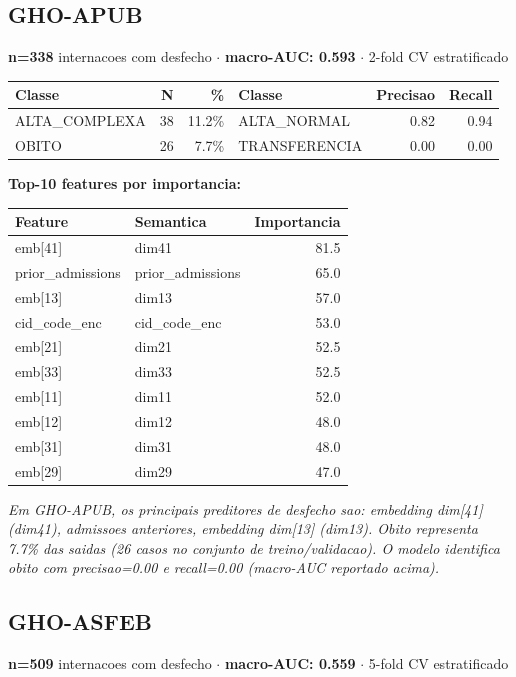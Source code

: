 \documentclass[11pt,a4paper]{article}
\begin{document}
\subsection{GHO-APUB}
\textbf{n=338} internacoes com desfecho $\cdot$ \textbf{macro-AUC: 0.593} $\cdot$ 2-fold CV estratificado

\begin{tabular}{lrr|lrr}
\toprule
Classe & N & \% & Classe & Precisao & Recall \\
\midrule
ALTA\_COMPLEXA & 38 & 11.2\% & ALTA\_NORMAL & 0.82 & 0.94 \\
OBITO & 26 & 7.7\% & TRANSFERENCIA & 0.00 & 0.00 \\
\bottomrule
\end{tabular}

\vspace{4pt}\noindent\textbf{Top-10 features por importancia:}

\begin{tabular}{llr}
\toprule
Feature & Semantica & Importancia \\
\midrule
emb[41] & dim41 & 81.5 \\
prior\_admissions & prior\_admissions & 65.0 \\
emb[13] & dim13 & 57.0 \\
cid\_code\_enc & cid\_code\_enc & 53.0 \\
emb[21] & dim21 & 52.5 \\
emb[33] & dim33 & 52.5 \\
emb[11] & dim11 & 52.0 \\
emb[12] & dim12 & 48.0 \\
emb[31] & dim31 & 48.0 \\
emb[29] & dim29 & 47.0 \\
\bottomrule
\end{tabular}

\vspace{4pt}\noindent\textit{Em GHO-APUB, os principais preditores de desfecho sao: embedding dim[41] (dim41), admissoes anteriores, embedding dim[13] (dim13). Obito representa 7.7\% das saidas (26 casos no conjunto de treino/validacao). O modelo identifica obito com precisao=0.00 e recall=0.00 (macro-AUC reportado acima).}

\subsection{GHO-ASFEB}
\textbf{n=509} internacoes com desfecho $\cdot$ \textbf{macro-AUC: 0.559} $\cdot$ 5-fold CV estratificado
\end{document}

